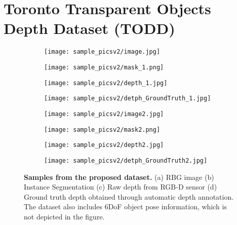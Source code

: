 \documentclass{article}
\newcommand{\dataName}{TODD}
\begin{document}
\section{Toronto Transparent Objects Depth Dataset (\dataName)}

\begin{figure}[h]
\centering
\begin{subfigure}[b]{0.21\textwidth}
    \centering
    \texttt{[image: sample\_picsv2/image.jpg]}\\
\end{subfigure}%
\begin{subfigure}[b]{0.21\textwidth}
    \centering
    \texttt{[image: sample\_picsv2/mask\_1.png]} \\
\end{subfigure}%
\begin{subfigure}[b]{0.21\textwidth}
    \centering
    \texttt{[image: sample\_picsv2/depth\_1.jpg]} \\
\end{subfigure}%
\begin{subfigure}[b]{0.21\textwidth}
    \centering
    \texttt{[image: sample\_picsv2/detph\_GroundTruth\_1.jpg]} \\
\end{subfigure}%

\begin{subfigure}[b]{0.21\textwidth}
    \centering
    \texttt{[image: sample\_picsv2/image2.jpg]}\\
\end{subfigure}%
\begin{subfigure}[b]{0.21\textwidth}
    \centering
    \texttt{[image: sample\_picsv2/mask2.png]} \\
\end{subfigure}%
\begin{subfigure}[b]{0.21\textwidth}
    \centering
    \texttt{[image: sample\_picsv2/depth2.jpg]} \\
\end{subfigure}%
\begin{subfigure}[b]{0.21\textwidth}
    \centering
    \texttt{[image: sample\_picsv2/detph\_GroundTruth2.jpg]} \\
\end{subfigure}%


\caption{\textbf{Samples from the proposed dataset.} (a) RBG image (b) Instance Segmentation (c) Raw depth from RGB-D sensor (d) Ground truth depth obtained through automatic depth annotation. The dataset also includes 6DoF object pose information, which is not depicted in the figure.}
\label{fig:dataset_inference}
\end{figure}
\end{document}
